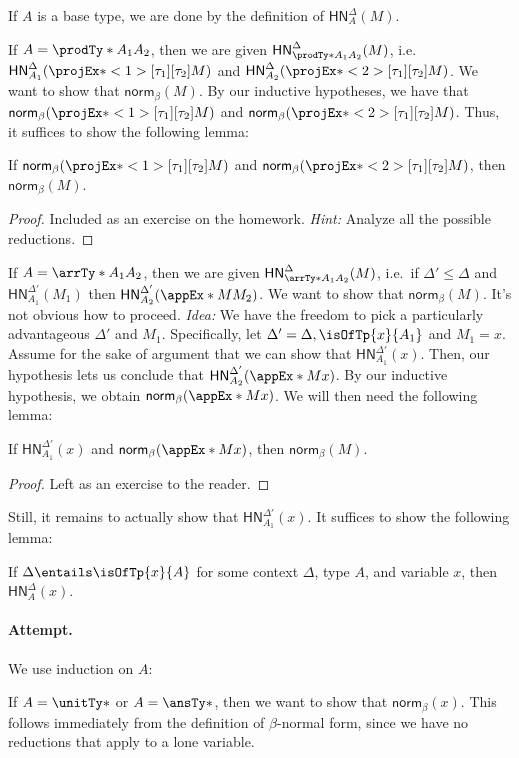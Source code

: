 \documentclass[letterpaper]{article}
\newcommand{\De}[0]{\Delta}
\newcommand{\betaNorm}[1]{\mathsf{norm}_\beta(#1)}
\newcommand{\HN}[3]{\mathsf{HN}^{#1}_{#2}(#3)}
\begin{document}
If $A$ is a base type, we are done by the definition of $\HN{\De}{A}{M}$.

If $A = \prodTy*{A_1}{A_2}$, then we are given
$\HN{\De}{\prodTy*{A_1}{A_2}}{M}$, i.e.\ $\HN{\De}{A_1}{\fstEx*{M}}$ and
$\HN{\De}{A_2}{\sndEx*{M}}$. We want to show that $\betaNorm{M}$. By our
inductive hypotheses, we have that $\betaNorm{\fstEx*{M}}$ and
$\betaNorm{\sndEx*{M}}$. Thus, it suffices to show the following lemma:
\begin{lemma}\label{lem:betaNorm-prod}
If $\betaNorm{\fstEx*{M}}$ and $\betaNorm{\sndEx*{M}}$, then $\betaNorm{M}$.
\end{lemma}
\begin{proof}
Included as an exercise on the homework. \emph{Hint:} Analyze all the possible
reductions.
\end{proof}

If $A = \arrTy*{A_1}{A_2}$, then we are given $\HN{\De}{\arrTy*{A_1}{A_2}}{M}$,
i.e.\ if $\De' \leq \De$ and $\HN{\De'}{A_1}{M_1}$ then
$\HN{\De'}{A_2}{\appEx*{M}{M_2}}$. We want to show that $\betaNorm{M}$. It's not
obvious how to proceed. \emph{Idea:} We have the freedom to pick a particularly
advantageous $\De'$ and $M_1$. Specifically, let $\De' = \De, \isOfTp{x}{A_1}$
and $M_1 = x$. Assume for the sake of argument that we can show that
$\HN{\De'}{A_1}{x}$. Then, our hypothesis lets us conclude that
$\HN{\De'}{A_2}{\appEx*{M}{x}}$. By our inductive hypothesis, we obtain
$\betaNorm{\appEx*{M}{x}}$. We will then need the following lemma:
\begin{lemma}\label{lem:betaNorm-app}
If $\HN{\De'}{A_1}{x}$ and $\betaNorm{\appEx*{M}{x}}$, then $\betaNorm{M}$.
\end{lemma}
\begin{proof}
Left as an exercise to the reader.
\end{proof}

Still, it remains to actually show that $\HN{\De'}{A_1}{x}$. It suffices to show
the following lemma:
\begin{lemma}
If $\De \entails \isOfTp{x}{A}$ for some context $\De$, type $A$, and variable
$x$, then $\HN{\De}{A}{x}$.
\end{lemma}
\paragraph{Attempt.} We use induction on $A$:

If $A = \unitTy*$ or $A = \ansTy*$, then we want to show that $\betaNorm{x}$.
This follows immediately from the definition of $\beta$-normal form, since we
have no reductions that apply to a lone variable.
\end{document}
